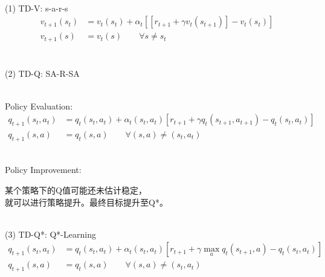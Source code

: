 \documentclass{article}
\begin{document}
~ \\[3pt]
(1) TD-V: \qquad s-a-r-s 
\begin{align*}
    v_{t+1} (s_{t}) &= v_{t} (s_{t}) + \alpha_{t} 
        [ [r_{t+1} + \gamma v_{t} (s_{t+1})] - v_{t} (s_{t}) ] \\[3pt]
    v_{t+1} (s)     &= v_{t} (s) 
    \qquad \forall s \neq s_{t} \\[3pt]
\end{align*}


~ \\[3pt]
(2) TD-Q: \qquad SA-R-SA 

~ \\[3pt]
Policy Evaluation: 
\begin{align*}
    q_{t+1} (s_{t}, a_{t}) 
        &= q_{t} (s_{t}, a_{t}) + \alpha_{t} (s_{t}, a_{t}) 
        [ r_{t+1} + \gamma q_{t} (s_{t+1}, a_{t+1}) 
        - q_{t} (s_{t}, a_{t}) ] \\[3pt]
    q_{t+1} (s, a) &= q_{t} (s, a) 
    \qquad \forall (s, a) \neq (s_{t}, a_{t}) 
\end{align*}

~ \\[3pt]
Policy Improvement: \\[3pt]
\begin{CJK}{UTF8}{gbsn}
    某个策略下的Q值可能还未估计稳定， \\[3pt]
    就可以进行策略提升。最终目标提升至Q*。 \\[3pt]
\end{CJK}


~ \\[3pt]
(3) TD-Q*: \qquad Q*-Learning 
\begin{align*}
    q_{t+1} (s_{t}, a_{t}) 
        &= q_{t} (s_{t}, a_{t}) + \alpha_{t} (s_{t}, a_{t}) 
        [ r_{t+1} + \gamma \max_{a} q_{t} (s_{t+1}, a) 
        - q_{t} (s_{t}, a_{t}) ] \\[3pt]
    q_{t+1} (s, a) &= q_{t} (s, a) 
    \qquad \forall (s, a) \neq (s_{t}, a_{t}) 
\end{align*}
\end{document}
